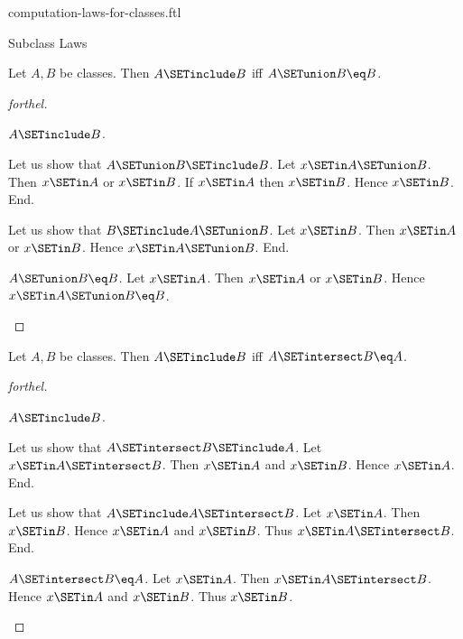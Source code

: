 \documentclass{stex}
\begin{document}
\begin{smodule}{computation-laws-for-classes.ftl}
\begin{sfragment}{Subclass Laws}
  \begin{proposition}[forthel,id=FOUNDATIONS_02_6657236858306560]
    Let $A, B$ be classes.
    Then $A \SETinclude B$ iff $A \SETunion B \eq B$.
  \end{proposition}
  \begin{proof}[forthel]
    \begin{case}{$A \SETinclude B$.}

      Let us show that $A \SETunion B \SETinclude B$.
        Let $x \SETin A \SETunion B$.
        Then $x \SETin A$ or $x \SETin B$.
        If $x \SETin A$ then $x \SETin B$.
        Hence $x \SETin B$.
      End.

      Let us show that $B \SETinclude A \SETunion B$.
        Let $x \SETin B$.
        Then $x \SETin A$ or $x \SETin B$.
        Hence $x \SETin A \SETunion B$.
      End.
    \end{case}

    \begin{case}{$A \SETunion B \eq B$.}
      Let $x \SETin A$.
      Then $x \SETin A$ or $x \SETin B$.
      Hence $x \SETin A \SETunion B \eq B$.
    \end{case}
  \end{proof}

  \begin{proposition}[forthel,id=FOUNDATIONS_02_2356449346846720]
    Let $A, B$ be classes.
    Then $A \SETinclude B$ iff $A \SETintersect B \eq A$.
  \end{proposition}
  \begin{proof}[forthel]
    \begin{case}{$A \SETinclude B$.}

      Let us show that $A \SETintersect B \SETinclude A$.
        Let $x \SETin A \SETintersect B$.
        Then $x \SETin A$ and $x \SETin B$.
        Hence $x \SETin A$.
      End.

      Let us show that $A \SETinclude A \SETintersect B$.
        Let $x \SETin A$.
        Then $x \SETin B$.
        Hence $x \SETin A$ and $x \SETin B$.
        Thus $x \SETin A \SETintersect B$.
      End.
    \end{case}

    \begin{case}{$A \SETintersect B \eq A$.}
      Let $x \SETin A$.
      Then $x \SETin A \SETintersect B$.
      Hence $x \SETin A$ and $x \SETin B$.
      Thus $x \SETin B$.
    \end{case}
  \end{proof}
\end{sfragment}


\end{smodule}
\end{document}
